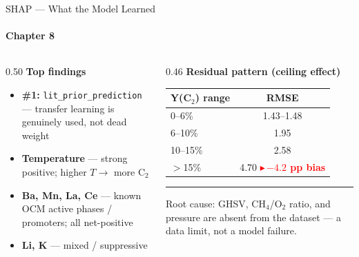 \documentclass[aspectratio=169,12pt]{beamer}
\newcommand{\badge}[2]{%
  {\footnotesize\bfseries\textcolor{#1}{$\blacktriangleright$\,#2}}}
\newcommand{\sidenote}[1]{%
  \vspace{4pt}%
  \noindent\textcolor{accent}{\rule{2pt}{0.9em}}\hspace{7pt}%
  \parbox[t]{0.90\linewidth}{\scriptsize\color{darkgray}#1}%
  \vspace{2pt}}
\begin{document}
\begin{frame}{SHAP — What the Model Learned}
  \framesubtitle{Chapter 8}

  \begin{columns}[T]

    \begin{column}{0.50\textwidth}
      \textbf{Top findings}
      \begin{itemize}\small
        \item \textbf{\#1:} \texttt{lit\_prior\_prediction} — transfer
          learning is genuinely used, not dead weight
        \item \textbf{Temperature} — strong positive; higher $T \to$ more C$_2$
        \item \textbf{Ba, Mn, La, Ce} — known OCM active phases / promoters;
          all net-positive
        \item \textbf{Li, K} — mixed / suppressive
      \end{itemize}
    \end{column}

    \begin{column}{0.46\textwidth}
      \textbf{Residual pattern (ceiling effect)}
      \begin{tabular}{lc}
        \toprule
        Y(C$_2$) range & RMSE \\
        \midrule
        0–6\%   & 1.43–1.48 \\
        6–10\%  & 1.95 \\
        10–15\% & 2.58 \\
        $>$15\% & 4.70 \quad \badge{red}{$-4.2$ pp bias} \\
        \bottomrule
      \end{tabular}

      \vspace{5pt}
      \sidenote{Root cause: GHSV, CH$_4$/O$_2$ ratio, and pressure are absent
        from the dataset — a data limit, not a model failure.}
    \end{column}

  \end{columns}

\end{frame}
\end{document}
